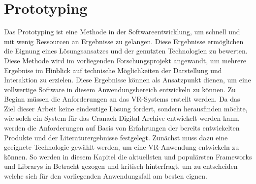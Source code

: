\documentclass[a4paper,12pt,oneside]{article}
\begin{document}
  \section{Prototyping}
    Das Prototyping ist eine Methode in der Softwareentwicklung, um schnell und mit 
    wenig Ressourcen an Ergebnisse zu gelangen. Diese Ergebnisse ermöglichen die
    Eignung eines Lösungsansatzes und der genutzten Technologien zu bewerten.
    Diese Methode wird im vorliegenden Forschungsprojekt angewandt, um mehrere Ergebnise im
    Hinblick auf technische Möglichkeiten der Darstellung und Interaktion zu erzielen.
    Diese Ergebnisse können als Ansatzpunkt dienen, um eine vollwertige Software 
    in diesem Anwendungsbereich entwickeln zu können.
    Zu Beginn müssen die Anforderungen an das VR-Systems erstellt werden. Da
    das Ziel dieser Arbeit keine eindeutige Lösung fordert, sondern herausfinden möchte,
    wie solch ein System für das Cranach Digital Archive entwickelt werden kann, werden
    die Anforderungen auf Basis von Erfahrungen der bereits entwickelten Produkte und der 
    Literaturergebnisse festgelegt.
    Zunächst muss dazu eine geeignete Technologie
    gewählt werden, um eine VR-Anwendung entwickeln zu können. So werden in diesem Kapitel
    die aktuellsten und populärsten Frameworks und Librarys in Betracht gezogen und kritisch
    hinterfragt, um zu entscheiden welche sich für den 
    vorliegenden Anwendungsfall am besten eignen.
\end{document}
